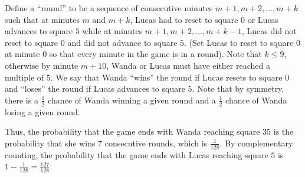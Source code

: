 Define a ``round'' to be a sequence of consecutive minutes $m+1,m+2,\ldots,m+k$ such that at minutes $m$ and $m+k$, Lucas had to reset to square $0$ or Lucas advances to square $5$ while at minutes $m+1,m+2,\ldots,m+k-1$, Lucas did not reset to square $0$ and did not advance to square $5$. (Set Lucas to reset to square $0$ at minute $0$ so that every minute in the game is in a round). Note that $k\leq9$, otherwise by minute $m+10$, Wanda or Lucas must have either reached a multiple of $5$. We say that Wanda ``wins'' the round if Lucas resets to square $0$ and ``loses'' the round if Lucas advances to square $5$. Note that by symmetry, there is a $\frac{1}{2}$ chance of Wanda winning a given round and a $\frac{1}{2}$ chance of Wanda losing a given round.

Thus, the probability that the game ends with Wanda reaching square $35$ is the probability that she wins $7$ consecutive rounds, which is $\frac{1}{128}$. By complementary counting, the probability that the game ends with Lucas reaching square $5$ is $1-\frac{1}{128}=\boxed{\frac{127}{128}}$.